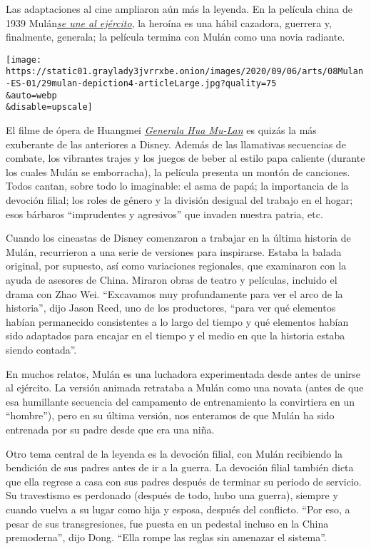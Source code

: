 Las adaptaciones al cine ampliaron aún más la leyenda. En la película
china de 1939
Mulán\href{https://www.youtube.com/watch?v=B99xRkrwdTs\&t=2288s\&ab_channel=ModernChineseCulturalStudies}{\emph{se
une al ejército}}, la heroína es una hábil cazadora, guerrera y,
finalmente, generala; la película termina con Mulán como una novia
radiante.

\texttt{[image: https://static01.graylady3jvrrxbe.onion/images/2020/09/06/arts/08Mulan-ES-01/29mulan-depiction4-articleLarge.jpg?quality=75\\\&auto=webp\\\&disable=upscale]}

El filme de ópera de Huangmei
\href{https://www.youtube.com/watch?v=IxNRvoIdLHQ}{\emph{Generala Hua
Mu-Lan}} es quizás la más exuberante de las anteriores a Disney. Además
de las llamativas secuencias de combate, los vibrantes trajes y los
juegos de beber al estilo papa caliente (durante los cuales Mulán se
emborracha), la película presenta un montón de canciones. Todos cantan,
sobre todo lo imaginable: el asma de papá; la importancia de la devoción
filial; los roles de género y la división desigual del trabajo en el
hogar; esos bárbaros ``imprudentes y agresivos'' que invaden nuestra
patria, etc.

Cuando los cineastas de Disney comenzaron a trabajar en la última
historia de Mulán, recurrieron a una serie de versiones para inspirarse.
Estaba la balada original, por supuesto, así como variaciones
regionales, que examinaron con la ayuda de asesores de China. Miraron
obras de teatro y películas, incluido el drama con Zhao Wei. ``Excavamos
muy profundamente para ver el arco de la historia'', dijo Jason Reed,
uno de los productores, ``para ver qué elementos habían permanecido
consistentes a lo largo del tiempo y qué elementos habían sido adaptados
para encajar en el tiempo y el medio en que la historia estaba siendo
contada''.

En muchos relatos, Mulán es una luchadora experimentada desde antes de
unirse al ejército. La versión animada retrataba a Mulán como una novata
(antes de que esa humillante secuencia del campamento de entrenamiento
la convirtiera en un ``hombre''), pero en su última versión, nos
enteramos de que Mulán ha sido entrenada por su padre desde que era una
niña.

Otro tema central de la leyenda es la devoción filial, con Mulán
recibiendo la bendición de sus padres antes de ir a la guerra. La
devoción filial también dicta que ella regrese a casa con sus padres
después de terminar su periodo de servicio. Su travestismo es perdonado
(después de todo, hubo una guerra), siempre y cuando vuelva a su lugar
como hija y esposa, después del conflicto. ``Por eso, a pesar de sus
transgresiones, fue puesta en un pedestal incluso en la China
premoderna'', dijo Dong. ``Ella rompe las reglas sin amenazar el
sistema''.

